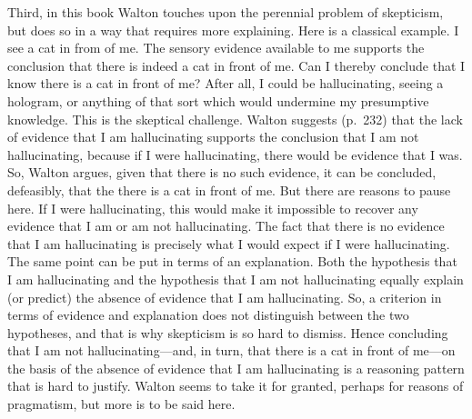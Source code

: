 \documentclass[12pt,a4paper]{article}
\begin{document}
Third, in this book Walton touches upon the 
perennial problem of skepticism, but does so in a way that requires 
more explaining. Here is a classical example. 
I see a cat in from of me. The sensory evidence available to me supports 
the conclusion that there is indeed a cat in front of me. 
Can I thereby conclude that I know there is a cat in front of me?
After all, I could be hallucinating, seeing a hologram, or anything of 
that sort which would undermine my presumptive knowledge. This is the skeptical challenge.
Walton suggests (p.\ 232) that the lack of evidence that I am hallucinating supports the conclusion
that I am not hallucinating, because if I were hallucinating, there would be
evidence that I was. So, Walton argues, given that there is no such
evidence, it can be concluded, defeasibly, that the 
there is a cat in front of me.  
But there are reasons to pause here. If I were hallucinating, this would make 
it impossible to recover any evidence that I am or am not hallucinating. The fact that there is no
evidence that I am hallucinating is precisely what I would expect if I
were hallucinating. The same point can be put in terms of an explanation. 
Both the hypothesis that I am hallucinating and the hypothesis that I am not hallucinating 
equally explain (or predict) the absence of evidence that I am hallucinating.
So, a criterion in terms of evidence and explanation does not distinguish between the two hypotheses, and that is why skepticism is so hard to dismiss.
Hence concluding that I am not hallucinating---and, in turn, that 
there is a cat in front of me---on the basis of the absence of evidence that I am hallucinating is a reasoning pattern that is hard to justify. Walton seems to take it for granted, perhaps for reasons of pragmatism, but more is to be said here. 
\end{document}
